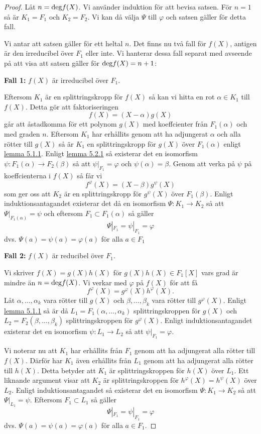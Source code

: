 \documentclass{article}
\newcommand{\grad}[0]{\textnormal{deg}}
\theoremstyle{definition}
\begin{document}
\begin{proof}
  Låt $n = \grad f(X)$. Vi använder induktion för att bevisa satsen. För $n = 1$ så är $K_1 = F_1$ och $K_2 = F_2$. Vi kan då välja 
  $\Psi$ till $\varphi$ och satsen gäller för detta fall. 

  Vi antar att satsen gäller för ett heltal $n$. Det finns nu två fall för $f(X)$, antigen är den irreducibel över $F_1$ eller inte. Vi hanterar dessa fall separat
  med avseende på att visa att satsen gäller för $\grad f(X) = n+1$:

  \textbf{Fall 1:} $f(X)$ är irreducibel över $F_1$. 

  Eftersom $K_1$ är en splittringskropp för $f(X)$ så kan vi hitta en rot $\alpha \in K_1$ till $f(X)$. Detta gör att faktoriseringen 
  \[f(X) = (X-\alpha)g(X)\]
  går att åstadkomma för ett polynom $g(X)$ med koeffcienter från $F_1(\alpha)$ och med graden $n$. Eftersom $K_1$ har erhållits genom att ha adjungerat $\alpha$ 
  och alla rötter till $g(X)$ så är $K_1$ en splittringskropp för $g(X)$ över $F_1(\alpha)$ enligt \hyperlink{lemma6.0.1}{lemma 5.1.1}.
  Enligt \hyperlink{6.0.2}{lemma 5.2.1} så existerar det en isomorfism 
  $\psi: F_1(\alpha) \rightarrow F_2(\beta)$ så att $\psi |_{F_1} = \varphi$ och $\psi(\alpha) = \beta.$ Genom att verka på $\psi$ på koeffcienterna i $f(X)$
  så får vi 
  \[f^{\varphi}(X) = (X - \beta)g^{\psi}(X)\]
  som ger oss att $K_2$ är en splittringskropp för $g^{\psi}(X)$ över $F_1(\beta)$. Enligt induktionsantagandet existerar det då en isomorfism $\Psi: K_1 \rightarrow K_2$
  så att $\Psi |_{F_1(\alpha)} = \psi$ och eftersom $F_1 \subset F_1(\alpha)$ så gäller 
  \[\Psi |_{F_1} = \psi |_{F_1} = \varphi\]
  dvs. $\Psi(a) = \psi(a) = \varphi(a)$ för alla $a \in F_1$

  \textbf{Fall 2:} $f(X)$ är reducibel över $F_1$.

Vi skriver $f(X) = g(X)h(X)$ för $g(X)h(X) \in F_1[X]$ vars grad är mindre än $n = \grad f(X)$. Vi verkar med $\varphi$ på $f(X)$ för att få 
\[f^{\varphi}(X) = g^{\varphi}(X)h^{\varphi}(X). \]
Låt $\alpha, \ldots, \alpha_k$ vara rötter till $g(X)$ och $\beta, \ldots, \beta_k$ vara rötter till $g^{\varphi}(X).$
Enligt \hyperlink{lemma6.0.1}{lemma 5.1.1} så är då $L_1 = F_1(\alpha, \ldots, \alpha_k)$ splittringskroppen för $g(X)$ och 
$L_2 = F_2(\beta, \ldots, \beta_k)$ splittringskroppen för $g^{\varphi}(X).$ Enligt induktionsantagandet existerar det en 
isomorfism $\psi: L_1 \rightarrow L_2$ så att $\psi |_{F_1} = \varphi.$

Vi noterar nu att $K_1$ har erhållits från $F_1$ genom att ha adjungerat alla rötter till $f(X)$. Därför har $K_1$ även erhållits
från $L_1$ genom att ha adjungerat alla rötter till $h(X)$. Detta betyder att $K_1$ är splittringskroppen för $h(X)$ över $L_1$. Ett liknande 
argument visar att $K_2$ är splittringskroppen för $h^{\varphi}(X) = h^{\psi}(X)$ över $L_2$. Enligt induktionsantagandet så existerar det 
en isomorfism $\Psi: K_1 \rightarrow K_2$ så att $\Psi |_{L_1} = \psi$. Eftersom $F_1 \subset L_1$ så gäller 
\[\Psi |_{F_1} = \psi |_{F_1} = \varphi\]
dvs. $\Psi(a) = \psi(a) = \varphi(a)$ för alla $a \in F_1$. 
\end{proof}
\end{document}
